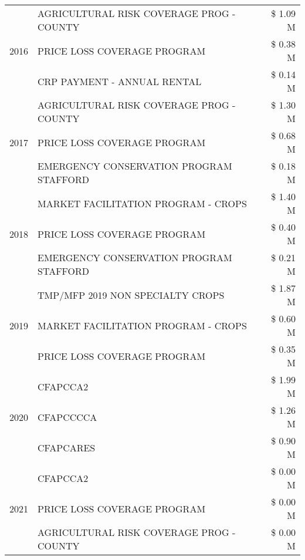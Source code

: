 \begin{tabular}{llr}
\multirow[t]{3}{*}{2016} & AGRICULTURAL RISK COVERAGE PROG - COUNTY & \$ 1.09 M \\
 & PRICE LOSS COVERAGE PROGRAM & \$ 0.38 M \\
 & CRP PAYMENT - ANNUAL RENTAL & \$ 0.14 M \\
\cline{1-3}
\multirow[t]{3}{*}{2017} & AGRICULTURAL RISK COVERAGE PROG - COUNTY & \$ 1.30 M \\
 & PRICE LOSS COVERAGE PROGRAM & \$ 0.68 M \\
 & EMERGENCY CONSERVATION PROGRAM STAFFORD & \$ 0.18 M \\
\cline{1-3}
\multirow[t]{3}{*}{2018} & MARKET FACILITATION PROGRAM - CROPS & \$ 1.40 M \\
 & PRICE LOSS COVERAGE PROGRAM & \$ 0.40 M \\
 & EMERGENCY CONSERVATION PROGRAM STAFFORD & \$ 0.21 M \\
\cline{1-3}
\multirow[t]{3}{*}{2019} & TMP/MFP 2019 NON SPECIALTY CROPS & \$ 1.87 M \\
 & MARKET FACILITATION PROGRAM - CROPS & \$ 0.60 M \\
 & PRICE LOSS COVERAGE PROGRAM & \$ 0.35 M \\
\cline{1-3}
\multirow[t]{3}{*}{2020} & CFAPCCA2 & \$ 1.99 M \\
 & CFAPCCCCA & \$ 1.26 M \\
 & CFAPCARES & \$ 0.90 M \\
\cline{1-3}
\multirow[t]{3}{*}{2021} & CFAPCCA2 & \$ 0.00 M \\
 & PRICE LOSS COVERAGE PROGRAM & \$ 0.00 M \\
 & AGRICULTURAL RISK COVERAGE PROG - COUNTY & \$ 0.00 M \\
\cline{1-3}
\bottomrule
\end{tabular}
